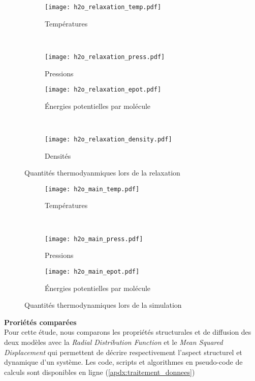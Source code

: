 \begin{figure}[h!]
    \centering
    \begin{subfigure}{.49\textwidth}
        \texttt{[image: h2o\_relaxation\_temp.pdf]}
        \caption{Températures}
    \end{subfigure}%
    ~
    \begin{subfigure}{.49\textwidth}
        \texttt{[image: h2o\_relaxation\_press.pdf]}
        \caption{Pressions}
    \end{subfigure}
    \begin{subfigure}{.49\textwidth}
        \texttt{[image: h2o\_relaxation\_epot.pdf]}
        \caption{Énergies potentielles par molécule}
    \end{subfigure}%
    ~
    \begin{subfigure}{.49\textwidth}
        \texttt{[image: h2o\_relaxation\_density.pdf]}
        \caption{Densités}
    \end{subfigure}
    \caption{Quantités thermodyanmiques lors de la relaxation}
    \label{fig:h2o_relaxation}
\end{figure}

\begin{figure}[h!]
    \centering
    \begin{subfigure}{.49\textwidth}
        \texttt{[image: h2o\_main\_temp.pdf]}
        \caption{Températures}
    \end{subfigure}%
    ~
    \begin{subfigure}{.49\textwidth}
        \texttt{[image: h2o\_main\_press.pdf]}
        \caption{Pressions}
    \end{subfigure}
    \begin{subfigure}{.49\textwidth}
        \texttt{[image: h2o\_main\_epot.pdf]}
        \caption{Énergies potentielles par molécule}
    \end{subfigure}
    \caption{Quantités thermodynamiques lors de la simulation}
    \label{fig:h2o_main}
\end{figure}

\textbf{Proriétés comparées}\\
Pour cette étude, nous comparons les propriétés structurales et de diffusion des deux modèles avec la \emph{Radial Distribution Function} et le \emph{Mean Squared Displacement} qui permettent de décrire respectivement l'aspect structurel et dynamique d'un système. Les code, scripts et algorithmes en pseudo-code de calculs sont disponibles en ligne (\autoref{apdx:traitement_donnees})

